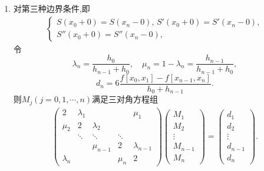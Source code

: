 \documentclass[../../main.tex]{subfiles}
\begin{document}
\begin{theorem}
\begin{enumerate}[(1)]
\item 对第三种边界条件,即
\begin{align*}
\begin{cases}
S(x_0 + 0) = S(x_n - 0), \, S'(x_0 + 0) = S'(x_n - 0), \\
S''(x_0 + 0) = S''(x_n - 0),
\end{cases}
\end{align*}
令
\[
\lambda_n = \frac{h_0}{h_{n - 1} + h_0}, \quad \mu_n = 1 - \lambda_n = \frac{h_{n - 1}}{h_{n - 1} + h_0},
\]
\[
d_n = 6 \frac{f[x_0, x_1] - f[x_{n - 1}, x_n]}{h_0 + h_{n - 1}}.
\]
则$M_j(j=0,1,\cdots,n)$满足三对角方程组
\begin{align}
\begin{pmatrix}
2 & \lambda_1 & & & \mu_1 \\
\mu_2 & 2 & \lambda_2 & & \\
& \ddots & \ddots & \ddots & \\
& & \mu_{n - 1} & 2 & \lambda_{n - 1} \\
\lambda_n & & & \mu_n & 2
\end{pmatrix}
\begin{pmatrix}
M_1 \\
M_2 \\
\vdots \\
M_{n - 1} \\
M_n
\end{pmatrix}
=
\begin{pmatrix}
d_1 \\
d_2 \\
\vdots \\
d_{n - 1} \\
d_n
\end{pmatrix}. \label{eq:数值分析-6.16}
\end{align}
\end{enumerate}
\end{theorem}
\end{document}
